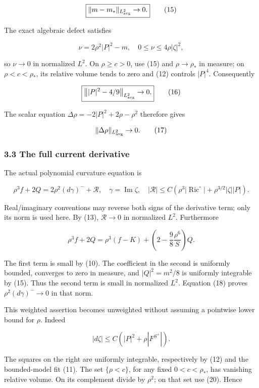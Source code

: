 \documentclass[11pt]{article}
\begin{document}
\[
 \boxed{\|m-m_*\|_{L^2_{\rm avg}}\to0.}\tag{15}
\]

The exact algebraic defect satisfies

\[
 \nu=2\rho^2|P|^2-m,\quad
 0\le\nu\le4\rho|\zeta|^2,
\]

so \(\nu\to0\) in normalized \(L^2\). On \(\rho\ge c>0\), use (15) and
\(\rho\to\rho_*\) in measure; on \(\rho<c<\rho_*\), its relative volume
tends to zero and (12) controls \(|P|^4\). Consequently

\[
 \boxed{\big\||P|^2-4/9\big\|_{L^2_{\rm avg}}\to0.}\tag{16}
\]

The scalar equation \(\Delta\rho=-2|P|^2+2\rho-\rho^2\) therefore gives

\[
 \|\Delta\rho\|_{L^2_{\rm avg}}\to0.\tag{17}
\]

\hypertarget{the-full-current-derivative}{%
\subsubsection{3.3 The full current
derivative}\label{the-full-current-derivative}}

The actual polynomial curvature equation is

\[
 \rho^3 f+2Q=2\rho^2(d\gamma)^-+\mathcal R,
 \quad \gamma=\operatorname{Im}\zeta,
 \quad |\mathcal R|\le
 C(\rho^3|\operatorname{Ric}^{\circ}|+
              \rho^{3/2}|\zeta||P|).
\tag{18}
\]

Real/imaginary conventions may reverse both signs of the derivative
term; only its norm is used here. By (13), \(\mathcal R\to0\) in
normalized \(L^2\). Furthermore

\[
 \rho^3 f+2Q
 =\rho^3(f-K)+\left(2-\frac98\frac{\rho^6}{S}\right)Q.
\tag{19}
\]

The first term is small by (10). The coefficient in the second is
uniformly bounded, converges to zero in measure, and \(|Q|^2=m^2/8\) is
uniformly integrable by (15). Thus the second term is small in
normalized \(L^2\). Equation (18) proves \(\rho^2(d\gamma)^-\to0\) in
that norm.

This weighted assertion becomes unweighted without assuming a pointwise
lower bound for \(\rho\). Indeed

\[
 |d\zeta|\le C(|P|^2+\rho|F^{S^+}|).
\tag{20}
\]

The squares on the right are uniformly integrable, respectively by (12)
and the bounded-model fit (11). The set \(\{\rho<c\}\), for any fixed
\(0<c<\rho_*\), has vanishing relative volume. On its complement divide
by \(\rho^2\); on that set use (20). Hence
\end{document}
